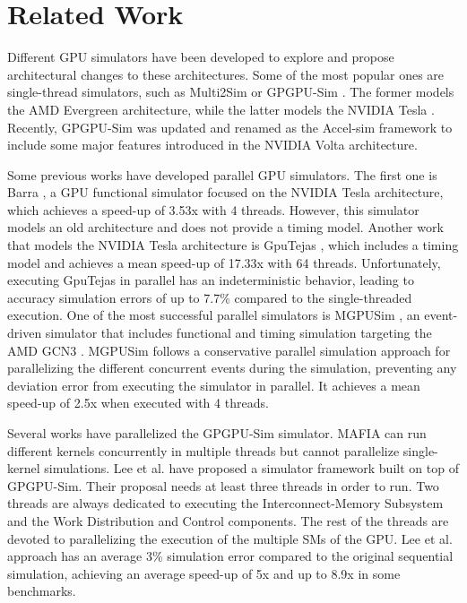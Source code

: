 \section{Related Work}\label{sec:relatedwork}

\par
Different GPU simulators have been developed to explore and propose architectural changes to these architectures. Some of the most popular ones are single-thread simulators, such as Multi2Sim \cite{multi2sim} or GPGPU-Sim \cite{gpgpusimOriginal}. The former models the AMD Evergreen \cite{amdevergreen} architecture, while the latter models the NVIDIA Tesla \cite{teslaHotchips}. Recently, GPGPU-Sim was updated and renamed as the Accel-sim framework \cite{accelsim} to include some major features introduced in the NVIDIA Volta \cite{voltaPaper} architecture.

\par
Some previous works have developed parallel GPU simulators. The first one is Barra \cite{barra}, a GPU functional simulator focused on the NVIDIA Tesla architecture, which achieves a speed-up of 3.53x with 4 threads. However, this simulator models an old architecture and does not provide a timing model. Another work that models the NVIDIA Tesla architecture is GpuTejas \cite{gputejas}, which includes a timing model and achieves a mean speed-up of 17.33x with 64 threads. Unfortunately, executing GpuTejas in parallel has an indeterministic behavior, leading to accuracy simulation errors of up to 7.7\% compared to the single-threaded execution. One of the most successful parallel simulators is MGPUSim \cite{mgpusim}, an event-driven simulator that includes functional and timing simulation targeting the AMD GCN3 \cite{amdgcn3}. MGPUSim follows a conservative parallel simulation approach for parallelizing the different concurrent events during the simulation, preventing any deviation error from executing the simulator in parallel. It achieves a mean speed-up of 2.5x when executed with 4 threads.

\par
Several works have parallelized the GPGPU-Sim simulator. MAFIA \cite{mafia} can run different kernels concurrently in multiple threads but cannot parallelize single-kernel simulations. Lee et al. \cite{parallelGPUSim1} \cite{parallelGPUSim2} have proposed a simulator framework built on top of GPGPU-Sim. Their proposal needs at least three threads in order to run. Two threads are always dedicated to executing the Interconnect-Memory Subsystem and the Work Distribution and Control components. The rest of the threads are devoted to parallelizing the execution of the multiple SMs of the GPU. Lee et al. approach has an average 3\% simulation error compared to the original sequential simulation, achieving an average speed-up of 5x and up to 8.9x in some benchmarks.

